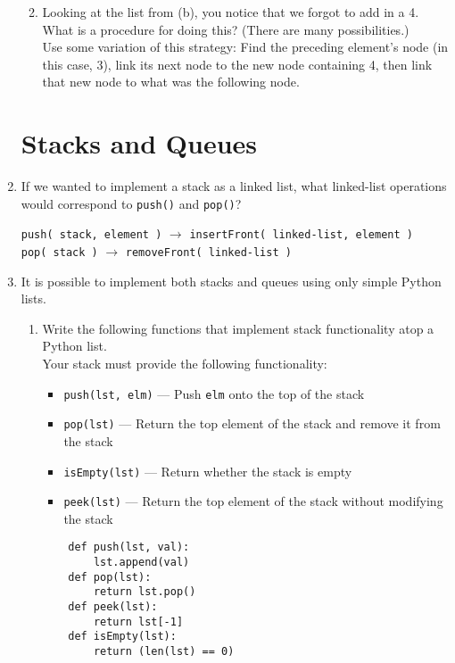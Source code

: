 \documentclass[11pt]{article}
\newenvironment{answer}{\large\lstset{basicstyle=\tiny\ttfamily}\color{white}}{}
\newenvironment{answer}{\large\lstset{basicstyle=\large\ttfamily}\color{red}}{}
\begin{document}
\begin{enumerate}
\begin{enumerate}
\begin{answer}
\begin{lstlisting}
				\end{lstlisting}
				\end{answer}
				\vspace{1in}
            \item Looking at the list from (b), you notice that we forgot to
                  add in a 4. What is a procedure for doing this? (There are
                  many possibilities.) \\
                \begin{answer}
				Use some variation of this strategy: Find the preceding element's node (in this case, 3), link its next node to the new node containing 4, then link that new node to what was the following node.
				\end{answer}
				\vspace{1in}
        \end{enumerate}

\pagebreak
\section*{Stacks and Queues}
\item If we wanted to implement a stack as a linked list, what linked-list
	operations would correspond to \texttt{push()} and \texttt{pop()}?

	\begin{answer}
	\texttt{push( stack, element )} $\rightarrow$ \texttt{insertFront( linked-list, element )} \\
	\texttt{pop( stack )} $\rightarrow$ \texttt{removeFront( linked-list )}
	\end{answer}

\item It is possible to implement both stacks and queues using only simple Python lists.
\begin{enumerate}
\item Write the following functions that implement stack functionality atop a Python list. \\
Your stack must provide the following functionality:
	  \begin{itemize}
	  \item []\texttt{push(lst, elm)} --- Push \texttt{elm} onto the top of the stack
	  \item []\texttt{pop(lst)} --- Return the top element of the stack and remove it from the stack
	  \item []\texttt{isEmpty(lst)} --- Return whether the stack is empty
	  \item []\texttt{peek(lst)} --- Return the top element of the stack without modifying the stack 
	  \end{itemize}
	  \begin{answer}
	  \begin{lstlisting}
	def push(lst, val):
		lst.append(val)
	def pop(lst):
		return lst.pop()
	def peek(lst):
		return lst[-1]
	def isEmpty(lst):
		return (len(lst) == 0)
	  \end{lstlisting}
	  \end{answer}


\end{enumerate}
\end{enumerate}
\end{document}

